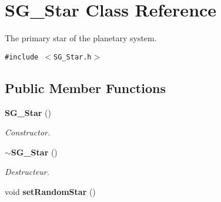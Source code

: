 \section{SG\_\-Star Class Reference}
\label{class_s_g___star}
The primary star of the planetary system.  


{\tt \#include $<$SG\_\-Star.h$>$}

\subsection*{Public Member Functions}
\begin{CompactItemize}
\item 
{\bf SG\_\-Star} ()
\begin{CompactList}\small\item\em Constructor. \item\end{CompactList}\item 
{\bf $\sim$SG\_\-Star} ()\label{class_s_g___star_a1}

\begin{CompactList}\small\item\em Destructeur. \item\end{CompactList}\item 
void {\bf set\-Random\-Star} ()\label{class_s_g___star_a2}


\end{CompactItemize}
